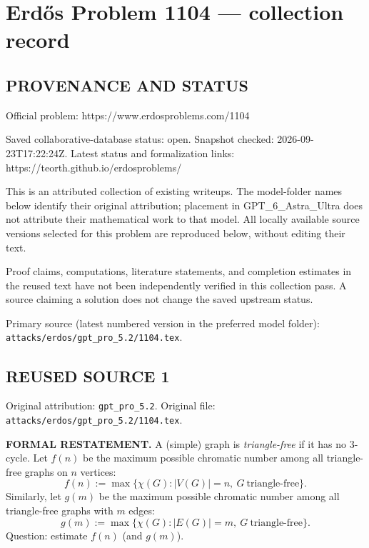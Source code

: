\section*{Erd\H{o}s Problem 1104 --- collection record}

\subsection*{PROVENANCE AND STATUS}
Official problem: https://www.erdosproblems.com/1104

Saved collaborative-database status: open.
Snapshot checked: 2026-09-23T17:22:24Z.
Latest status and formalization links: https://teorth.github.io/erdosproblems/

This is an attributed collection of existing writeups. The model-folder names below identify their original attribution; placement in GPT\_6\_Astra\_Ultra does not attribute their mathematical work to that model. All locally available source versions selected for this problem are reproduced below, without editing their text.

Proof claims, computations, literature statements, and completion estimates in the reused text have not been independently verified in this collection pass. A source claiming a solution does not change the saved upstream status.

Primary source (latest numbered version in the preferred model folder): \texttt{attacks/erdos/gpt\_pro\_5.2/1104.tex}.

\subsection*{REUSED SOURCE 1}
Original attribution: \texttt{gpt\_pro\_5.2}.
Original file: \texttt{attacks/erdos/gpt\_pro\_5.2/1104.tex}.


\noindent\textbf{FORMAL RESTATEMENT.}
A (simple) graph is \emph{triangle-free} if it has no $3$-cycle.
Let $f(n)$ be the maximum possible chromatic number among all triangle-free graphs on $n$ vertices:
\[f(n):=\max\{\chi(G): |V(G)|=n,\ G\ \text{triangle-free}\}.
\]
Similarly, let $g(m)$ be the maximum possible chromatic number among all triangle-free graphs with $m$ edges:
\[g(m):=\max\{\chi(G): |E(G)|=m,\ G\ \text{triangle-free}\}.
\]
Question: estimate $f(n)$ (and $g(m)$).

